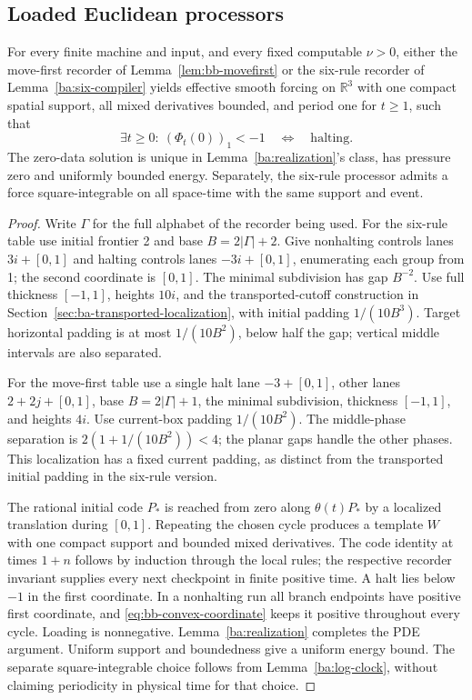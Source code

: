 \subsection{Loaded Euclidean processors}

\begin{theorem}
\label{ba:euclidean-boxes}
For every finite machine and input, and every fixed computable $\nu>0$,
either the move-first recorder of Lemma~\ref{lem:bb-movefirst} or the
six-rule recorder of Lemma~\ref{ba:six-compiler} yields effective smooth forcing on $\mathbb R^3$ with one
compact spatial support, all mixed derivatives bounded, and period one
for $t\ge1$, such that
\[
 \exists t\ge0:\ (\Phi_t(0))_1<-1
 \quad\Longleftrightarrow\quad\text{halting}.
\]
The zero-data solution is unique in Lemma~\ref{ba:realization}'s class,
has pressure zero and uniformly bounded energy.  Separately, the six-rule
processor admits a force square-integrable on all space-time with the
same support and event.
\end{theorem}
\begin{proof}\label{ba:euclidean-boxes-proof}
Write $\Gamma$ for the full alphabet of the recorder being used.
For the six-rule table use initial frontier 2 and base $B=2|\Gamma|+2$.
Give nonhalting controls lanes $3i+[0,1]$ and halting controls lanes
$-3i+[0,1]$, enumerating each group from 1; the second coordinate is
$[0,1]$.  The minimal subdivision has gap $B^{-2}$.  Use full thickness
$[-1,1]$, heights $10i$, and the transported-cutoff construction in
Section~\ref{sec:ba-transported-localization}, with initial padding $1/(10B^3)$.
Target horizontal padding is at most $1/(10B^2)$, below half the gap;
vertical middle intervals are also separated.

For the move-first table use a single halt lane $-3+[0,1]$, other lanes
$2+2j+[0,1]$, base $B=2|\Gamma|+1$, the minimal subdivision, thickness
$[-1,1]$, and heights $4i$.  Use current-box padding $1/(10B^2)$.
The middle-phase separation is
$2(1+1/(10B^2))<4$; the planar gaps handle the other phases.
This localization has a fixed current padding, as distinct from the
transported initial padding in the six-rule version.

The rational initial code $P_*$ is reached from zero along
$\theta(t)P_*$ by a localized translation during $[0,1]$.
Repeating the chosen cycle produces a template $W$ with one compact
support and bounded mixed derivatives.  The code identity at times
$1+n$ follows by induction through the local rules; the respective
recorder invariant supplies every next checkpoint in finite positive
time.  A halt lies below $-1$ in the first coordinate.  In a nonhalting
run all branch endpoints have positive first coordinate, and
\eqref{eq:bb-convex-coordinate} keeps it positive throughout every cycle.
Loading is nonnegative.  Lemma~\ref{ba:realization} completes the PDE
argument.  Uniform support and boundedness give a uniform energy bound.
The separate square-integrable choice follows from
Lemma~\ref{ba:log-clock}, without claiming periodicity in physical
time for that choice.
\end{proof}


